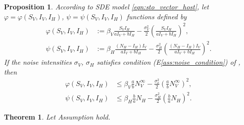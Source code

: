 \documentclass{amsart}
\theoremstyle{plain}
\newtheorem{theorem}{Theorem}
\newtheorem{proposition}{Proposition}
\theoremstyle{definition}
\begin{document}
        \begin{proposition}
            According to SDE model \eqref{eqn:sto_vector_host},
            let $\varphi = \varphi (S_V, I_V, I_H)$, 
            $\psi = \psi (S_V, I_V, I_H)$ 
            functions defined by
            \begin{equation}
                \begin{aligned}
                    \varphi (S_V, I_V, I_H) &:= 
                        \beta_V \frac{S_V I_H}{a I_V + b I_H}
                        - 
                        \frac{\sigma_V ^ 2}{2} 
                        \left(
                            \frac{S_V I_H}{a I_V + b I_H}
                        \right) ^2,
                    \\
                    \psi (S_V, I_V, I_H) &:=
                    \beta_H \frac{(N_H - I_H)  I_V}{a I_V + b I_H}
                        - 
                        \frac{\sigma_H ^ 2}{2} 
                        \left(
                            \frac{(N_H - I_H)  I_V}{a I_V + b I_H}
                        \right) ^2.
                \end{aligned}
            \end{equation}
            If the noise intensities $\sigma_V$, $\sigma_H$ satisfies condition 
            (E\textendash\ref{ass:noise_condition})
            of , then
            \begin{equation}
                \begin{aligned}
                  \varphi (S_V, I_V, I_H) & \leq \beta_V \frac{a}{b} N_V ^ 
                  {\infty}
                 - \frac{\sigma_v ^ 2}{2}
                  \left(
                          \frac{a}{b} N_V ^ {\infty}
                      \right) ^ 2,
                  \\
                  \psi (S_V, I_V, I_H) & \leq
                      \beta_H \frac{b}{a} N_H - \frac{\sigma_H ^ 2}{2}
                      \left(
                          \frac{b}{a} N_H
                      \right) ^ 2 .
                \end{aligned}
            \end{equation}
        \end{proposition}
%
%
        

%
%
%
%
        \begin{theorem}
            Let Assumption hold.
        \end{theorem}
%
%
\end{document}
